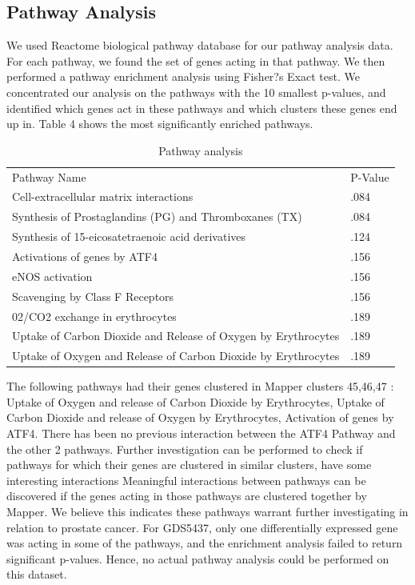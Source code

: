 \documentclass[preprint,10pt]{elsarticle}
\begin{document}
\subsection{Pathway Analysis}
	We used Reactome biological pathway database for our pathway analysis data. For each pathway, we found the set of genes acting in that pathway. We then performed a pathway enrichment analysis using Fisher?s Exact test. We concentrated our analysis on the pathways with the 10 smallest p-values, and identified which genes act in these pathways and which clusters these genes end up in. Table 4 shows the most significantly enriched pathways.


\begin{table}[]
\centering
\caption{Pathway analysis}
\label{my-label}
\begin{tabular}{ll}
Pathway Name                                                   & P-Value \\
Cell-extracellular matrix interactions                         & .084    \\
Synthesis of Prostaglandins (PG) and Thromboxanes (TX)         & .084    \\
Synthesis of 15-eicosatetraenoic acid derivatives              & .124    \\
Activations of genes by ATF4                                   & .156    \\
eNOS activation                                                & .156    \\
Scavenging by Class F Receptors                                & .156    \\
02/CO2 exchange in erythrocytes                                & .189    \\
Uptake of Carbon Dioxide and Release of Oxygen by Erythrocytes & .189    \\
Uptake of Oxygen and Release of Carbon Dioxide by Erythrocytes & .189   
\end{tabular}
\end{table}


The following pathways had their genes clustered in Mapper clusters 45,46,47 : Uptake of Oxygen and release of Carbon Dioxide by Erythrocytes, Uptake of Carbon Dioxide and release of Oxygen by Erythrocytes, Activation of genes by ATF4. There has been no previous interaction between the ATF4 Pathway and the other 2 pathways. Further investigation can be performed to check if pathways for which their genes are clustered in similar clusters, have some interesting interactions Meaningful interactions between pathways can be discovered if the genes acting in those pathways are clustered together by Mapper. We believe this indicates these pathways warrant further investigating in relation to prostate cancer.
	For GDS5437, only one differentially expressed gene was acting in some of the pathways, and the enrichment analysis failed to return significant p-values. Hence, no actual pathway analysis could be performed on this dataset.
\end{document}
